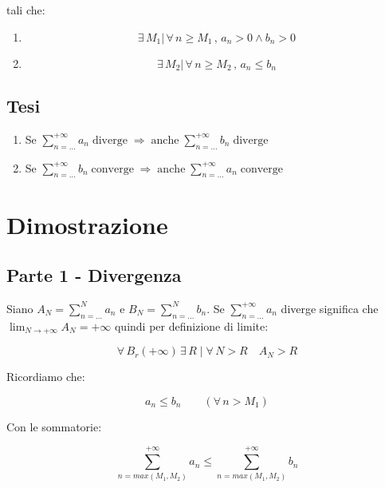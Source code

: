 \documentclass[../dimostrazioni]{subfiles}
\begin{document}
                tali che:
                \begin{enumerate}
                    \indentitem \item \[\exists \, M_1 | \, \forall \, n \geqslant M_1\,,\, a_n > 0 \land b_n > 0  \]
                    \indentitem \item \[\exists \, M_2 | \, \forall \, n \geqslant M_2\,,\, a_n \leqslant b_n \]
                \end{enumerate}
                
            \subsection*{Tesi}
                \begin{enumerate}
                    \indentitem \item Se \(\sum_{n=\dots}^{+\infty} a_n \; \text{diverge} \; \Rightarrow \; \text{anche} \; \sum_{n=\dots}^{+\infty} b_n \; \text{diverge} \)
                    \indentitem \item Se \(\sum_{n=\dots}^{+\infty} b_n \; \text{converge} \; \Rightarrow \; \text{anche} \; \sum_{n=\dots}^{+\infty} a_n \; \text{converge} \)
                \end{enumerate}
                

        \section*{Dimostrazione}

            \subsection*{Parte 1 - Divergenza}

                Siano \(A_N = \sum_{n=\dots}^{N} a_n\) e \(B_N = \sum_{n=\dots}^{N} b_n\). 
                Se \(\sum_{n=\dots}^{+\infty} a_n\) diverge significa che \(\lim_{N \to +\infty} A_N = +\infty\) 
                quindi per definizione di limite:

                \[\forall \, B_r(+\infty) \, \exists \, R \mid\forall \, N > R  \quad A_N > R\]

                Ricordiamo che:

                \[ a_n \leqslant b_n \qquad (\forall \, n > M_1) \]

                Con le sommatorie:

                \[ \sum_{n = max(M_1,M_2)}^{+\infty} a_n \leqslant \sum_{n = max(M_1,M_2)}^{+\infty} b_n\]
\end{document}
